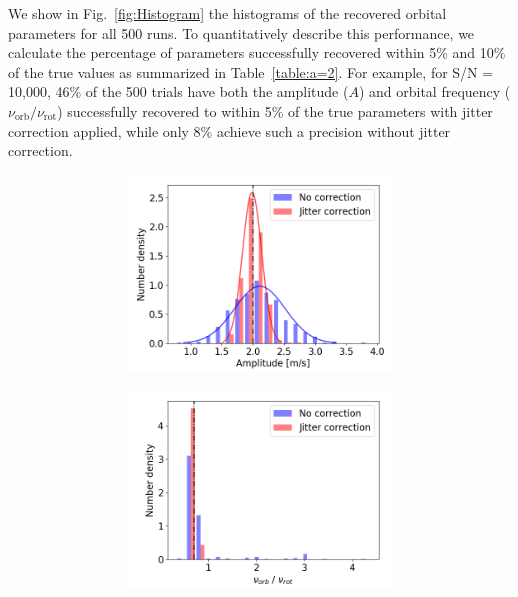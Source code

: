 We show in Fig.~\ref{fig:Histogram} the histograms of the recovered orbital parameters for all 500 runs. To quantitatively describe this performance, we calculate the percentage of parameters successfully recovered within 5\% and 10\% of the true values as summarized in Table~\ref{table:a=2}. For example, for S/N = 10,000, 46\% of the 500 trials have both the amplitude ($A$) and orbital frequency ($\nu_\text{orb}/\nu_\text{rot}$) successfully recovered to within 5\% of the true parameters with jitter correction applied, while only 8\% achieve such a precision without jitter correction. 


\begin{figure}[tbp]	
    \begin{subfigure}[b]{1.0\textwidth}
    		\begin{subfigure}[b]{0.49\textwidth}
        		\includegraphics[width=\textwidth]{./Figures/Methods/Histogram_new1_p2_sn10000.png}
        \end{subfigure}
        \begin{subfigure}[b]{0.49\textwidth}
        		\includegraphics[width=\textwidth]{./Figures/Methods/Histogram_new2_p2_sn10000.png}

\end{subfigure}
\end{subfigure}
\end{figure}
